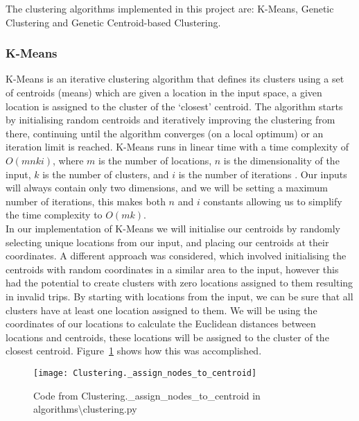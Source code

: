 \noindent
The clustering algorithms implemented in this project are: K-Means, Genetic Clustering and Genetic Centroid-based
Clustering.

\subsubsection{K-Means}\label{subsubsec:k-means}
K-Means is an iterative clustering algorithm that defines its clusters using a set of centroids (means) which are
given a location in the input space, a given location is assigned to the cluster of the `closest' centroid.
The algorithm starts by initialising random centroids and iteratively improving the clustering from there, continuing
until the algorithm converges (on a local optimum) or an iteration limit is reached.
K-Means runs in linear time with a time complexity of $O(m n k i)$, where $m$ is the number of locations, $n$ is the
dimensionality of the input, $k$ is the number of clusters, and $i$ is the number of iterations
.
Our inputs will always contain only two dimensions, and we will be setting a maximum number of iterations, this
makes both $n$ and $i$ constants allowing us to simplify the time complexity to $O(m k)$.\\

\noindent
In our implementation of K-Means we will initialise our centroids by randomly selecting unique locations from our
input, and placing our centroids at their coordinates.
A different approach was considered, which involved initialising the centroids with random coordinates in a similar
area to the input, however this had the potential to create clusters with zero locations assigned to them resulting
in invalid trips.
By starting with locations from the input, we can be sure that all clusters have at least one location assigned to them.
We will be using the coordinates of our locations to calculate the Euclidean distances between locations and centroids,
these locations will be assigned to the cluster of the closest centroid.
Figure~\ref{fig:Clustering._assign_nodes_to_centroid} shows how this was accomplished.
\begin{figure}[H]
    \centering
    \texttt{[image: Clustering.\_assign\_nodes\_to\_centroid]}
    \caption{Code from Clustering.\_assign\_nodes\_to\_centroid in algorithms\textbackslash clustering.py}
    \label{fig:Clustering._assign_nodes_to_centroid}
\end{figure}


